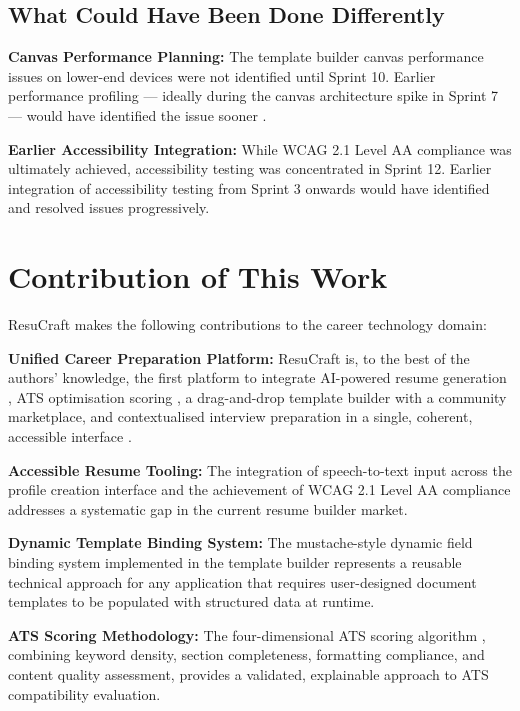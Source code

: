 \documentclass[12pt, a4paper, oneside]{report}
\begin{document}
\subsection{What Could Have Been Done Differently}

\textbf{Canvas Performance Planning:} The template builder canvas performance issues on lower-end devices were not identified until Sprint 10. Earlier performance profiling --- ideally during the canvas architecture spike in Sprint 7 --- would have identified the issue sooner \cite{pressman2014}.

\textbf{Earlier Accessibility Integration:} While WCAG 2.1 Level AA compliance \cite{wcag21} was ultimately achieved, accessibility testing was concentrated in Sprint 12. Earlier integration of accessibility testing from Sprint 3 onwards would have identified and resolved issues progressively.

\section{Contribution of This Work}

ResuCraft makes the following contributions to the career technology domain:

\textbf{Unified Career Preparation Platform:} ResuCraft is, to the best of the authors' knowledge, the first platform to integrate AI-powered resume generation \cite{gemini2023}, ATS optimisation scoring \cite{jobscan2021}, a drag-and-drop template builder with a community marketplace, and contextualised interview preparation in a single, coherent, accessible interface \cite{wcag21}.

\textbf{Accessible Resume Tooling:} The integration of speech-to-text input \cite{sears2003} across the profile creation interface and the achievement of WCAG 2.1 Level AA compliance addresses a systematic gap in the current resume builder market.

\textbf{Dynamic Template Binding System:} The mustache-style dynamic field binding system implemented in the template builder represents a reusable technical approach for any application that requires user-designed document templates to be populated with structured data at runtime.

\textbf{ATS Scoring Methodology:} The four-dimensional ATS scoring algorithm \cite{jobscan2021}, combining keyword density, section completeness, formatting compliance, and content quality assessment, provides a validated, explainable approach to ATS compatibility evaluation.
\end{document}
